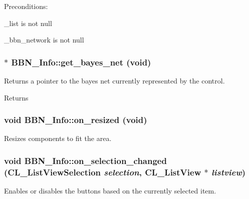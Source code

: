 Preconditions:
\begin{DoxyItemize}
\item \_\-list is not null
\item \_\-bbn\_\-network is not null 
\end{DoxyItemize}\hypertarget{classBBN__Info_aa3b9ae5ed212e5122cf392fd57d37c9e}{
\subsubsection[{get\_\-bayes\_\-net}]{ $\ast$ BBN\_\-Info::get\_\-bayes\_\-net (void)}}
\label{classBBN__Info_aa3b9ae5ed212e5122cf392fd57d37c9e}
Returns a pointer to the bayes net currently represented by the control.

\begin{DoxyReturn}{Returns}

\end{DoxyReturn}
\hypertarget{classBBN__Info_a9d5399c4ed1f2de0adb20cbaf49f1340}{
\subsubsection[{on\_\-resized}]{\setlength{\rightskip}{0pt plus 5cm}void BBN\_\-Info::on\_\-resized (void)}}
\label{classBBN__Info_a9d5399c4ed1f2de0adb20cbaf49f1340}
Resizes components to fit the area. \hypertarget{classBBN__Info_a9c157837dfd23537abace10cad5ebac8}{
\subsubsection[{on\_\-selection\_\-changed}]{\setlength{\rightskip}{0pt plus 5cm}void BBN\_\-Info::on\_\-selection\_\-changed (CL\_\-ListViewSelection {\em selection}, \/  CL\_\-ListView $\ast$ {\em listview})}}
\label{classBBN__Info_a9c157837dfd23537abace10cad5ebac8}
Enables or disables the buttons based on the currently selected item.


